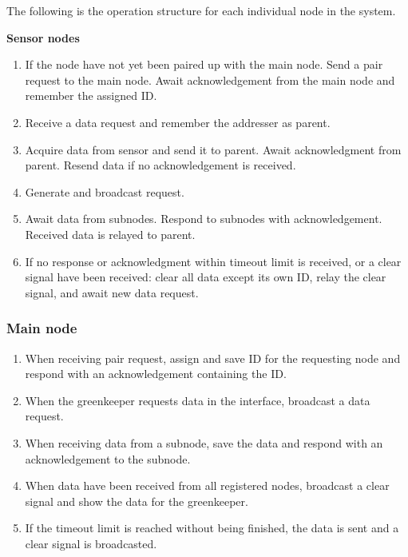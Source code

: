 The following is the operation structure for each individual node in the system.

\textbf{Sensor nodes} \\
\begin{enumerate}
\item If the node have not yet been paired up with the main node.
	\subitem Send a pair request to the main node.
	\subitem Await acknowledgement from the main node and remember the assigned ID.

\item Receive a data request and remember the addresser as parent.

\item Acquire data from sensor and send it to parent.
\subitem Await acknowledgment from parent.
	\subsubitem Resend data if no acknowledgement is received.

\item Generate and broadcast request.

\item Await data from subnodes.
	\subitem Respond to subnodes with acknowledgement.
	\subitem Received data is relayed to parent.
	
\item If no response or acknowledgment within timeout limit is received, or a clear signal have been received: clear all data except its own ID, relay the clear signal, and await new data request.
\end{enumerate}


\subsubsection*{Main node}
\begin{enumerate}
\item When receiving pair request, assign and save ID for the requesting node and respond with an acknowledgement containing the ID.
\item When the greenkeeper requests data in the interface, broadcast a data request.
\item When receiving data from a subnode, save the data and respond with an acknowledgement to the subnode.

\item When data have been received from all registered nodes, broadcast a clear signal and show the data for the greenkeeper.

\item If the timeout limit is reached without being finished, the data is sent and a clear signal is broadcasted.
\end{enumerate}




